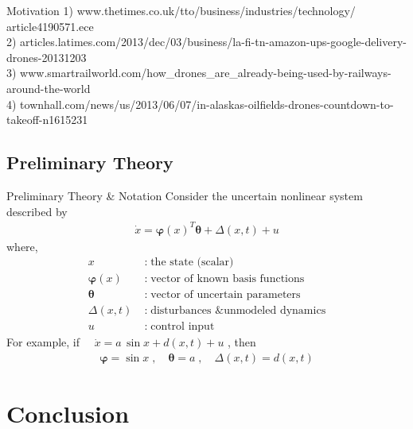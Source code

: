 \documentclass[english]{beamer}
\newcommand{\bs}[1]{\boldsymbol{#1}} %
\begin{document}
\begin{frame}{Motivation}
{\tiny %
1) www.thetimes.co.uk/tto/business/industries/technology/%
article4190571.ece\\ \vspace{-1pt}
2) articles.latimes.com/2013/dec/03/business/la-fi-tn-amazon-ups-google-delivery-drones-20131203 \\ \vspace{-1pt}
3) www.smartrailworld.com/how\_drones\_are\_already-being-used-by-railways-around-the-world \\ \vspace{-1pt}
4) townhall.com/news/us/2013/06/07/in-alaskas-oilfields-drones-countdown-to-takeoff-n1615231 \\ \vspace{-1pt}
}
%
\end{frame}


\subsection{Preliminary Theory}

\begin{frame}{Preliminary Theory \& Notation}
%
Consider the uncertain nonlinear system described by
\begin{align*}
\dot{x} = \bs{\varphi}(x)^T \bs{\theta} + \Delta(x,t) + u
\end{align*}
\pause
where, \vspace{-12pt}
\begin{align*}
x \; &: \; \text{the state (scalar)} \\
\bs{\varphi}(x) \; &: \; \text{vector of known basis functions} \\
\bs{\theta} \; &: \; \text{vector of uncertain parameters} \\
\Delta(x,t) \; &: \; \text{disturbances \& unmodeled dynamics} \\
u \; &: \; \text{control input}
\end{align*} \bigskip
%
%
\pause
For example, if 
$ \quad
\dot{x} = a\, \sin x + d(x,t) + u
$
, then \vspace{-12pt}
\begin{align*}
\bs{\varphi} = \sin x \;, \quad \bs{\theta} = a \;, \quad \Delta(x,t) = d(x,t)
\end{align*}
%
\end{frame}


\section{Conclusion}
\end{document}
